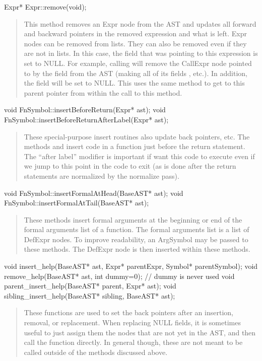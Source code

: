 \documentclass[10pt]{article}
\begin{document}
\begin{clang}
Expr* Expr::remove(void);
\end{clang}
\begin{quote}
This method removes an Expr node from the AST and updates all forward
and backward pointers in the removed expression and what is left.
Expr nodes can be removed from lists.  They can also be removed even
if they are not in lists.  In this case, the field that was pointing
to this expression is set to NULL.  For example, calling
 will remove the CallExpr node pointed
to by the  field from the AST (making all of its
 fields , etc.).  In addition, the
 field will be set to NULL.  This uses the same
 method to get to this parent pointer from within the
call to this method.
\end{quote}

\begin{clang}
void FnSymbol::insertBeforeReturn(Expr* ast);
void FnSymbol::insertBeforeReturnAfterLabel(Expr* ast);
\end{clang}
\begin{quote}
These special-purpose insert routines also update back pointers, etc.
The methods  and
 insert code in a function just
before the return statement.  The ``after label'' modifier is
important if want this code to execute even if we jump to this point
in the code to exit (as is done after the return statements are
normalized by the normalize pass).
\end{quote}

\begin{clang}
void FnSymbol::insertFormalAtHead(BaseAST* ast);
void FnSymbol::insertFormalAtTail(BaseAST* ast);
\end{clang}
\begin{quote}
These methods insert formal arguments at the beginning or end of the
formal arguments list of a function.  The formal arguments list is a
list of DefExpr nodes.  To improve readability, an ArgSymbol may be
passed to these methods.  The DefExpr node is then inserted within
these methods.
\end{quote}

\begin{clang}
void insert_help(BaseAST* ast, Expr* parentExpr, Symbol* parentSymbol);
void remove_help(BaseAST* ast, int dummy=0); // dummy is never used
void parent_insert_help(BaseAST* parent, Expr* ast);
void sibling_insert_help(BaseAST* sibling, BaseAST* ast);
\end{clang}
\begin{quote}
These functions are used to set the back pointers after an insertion,
removal, or replacement.  When replacing NULL fields, it is sometimes
useful to just assign them the nodes that are not yet in the AST, and
then call the  function directly.  In general though,
these are not meant to be called outside of the methods discussed
above.
\end{quote}
\end{document}
